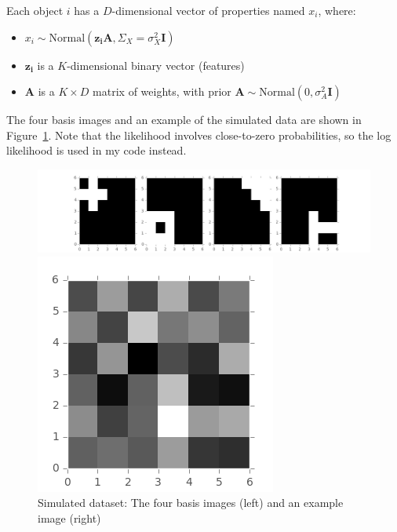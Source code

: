 Each object $i$ has a $D$-dimensional vector of properties named $x_i$, where:
\begin{itemize}
\item $x_i \sim \text{Normal}(\mathbf{z_i} \mathbf{A}, \Sigma_X = \sigma_X^2\mathbf{I})$
\item $\mathbf{z_i}$ is a $K$-dimensional binary vector (features)
\item $\mathbf{A}$ is a $K \times D$ matrix of weights, with prior $\mathbf{A} \sim \text{Normal}(0,\sigma_A^2 \mathbf{I})$
\end{itemize}

The four basis images and an example of the simulated data are shown in Figure~\ref{fig:images}. Note that the likelihood involves close-to-zero probabilities, so the log likelihood is used in my code instead.

\begin{figure}[!ht]
\centering
    \begin{minipage}{0.8\linewidth}
    \includegraphics[width=\linewidth]{Version0_Wrong/basis_images.png}
    \end{minipage}%
    \begin{minipage}{0.2\linewidth}
    \includegraphics[width=\linewidth]{Version0_Wrong/example_image.png}
    \end{minipage}
    \caption{Simulated dataset: The four basis images (left) and an example image (right)}
    \label{fig:images}
\end{figure}


